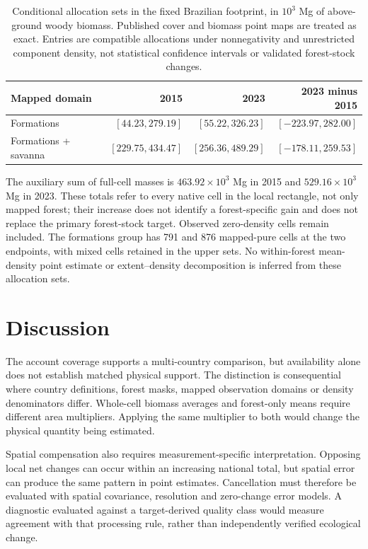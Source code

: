 \documentclass[11pt,a4paper]{article}
\begin{document}
\begin{table}[htbp]
\centering\small
\caption{Conditional allocation sets in the fixed Brazilian footprint, in $10^3$ Mg of above-ground woody biomass. Published cover and biomass point maps are treated as exact. Entries are compatible allocations under nonnegativity and unrestricted component density, not statistical confidence intervals or validated forest-stock changes.}\label{tab:allocation}
\begin{tabular}{lrrr}
\toprule
Mapped domain & 2015 & 2023 & 2023 minus 2015\\\midrule
Formations & $[44.23, 279.19]$ & $[55.22, 326.23]$ & $[-223.97, 282.00]$ \\
Formations + savanna & $[229.75, 434.47]$ & $[256.36, 489.29]$ & $[-178.11, 259.53]$ \\
\bottomrule
\end{tabular}
\end{table}

The auxiliary sum of full-cell masses is $463.92\times10^3$ Mg in 2015 and $529.16\times10^3$ Mg in 2023. These totals refer to every native cell in the local rectangle, not only mapped forest; their increase does not identify a forest-specific gain and does not replace the primary forest-stock target. Observed zero-density cells remain included. The formations group has 791 and 876 mapped-pure cells at the two endpoints, with mixed cells retained in the upper sets. No within-forest mean-density point estimate or extent--density decomposition is inferred from these allocation sets.

\section{Discussion}
The account coverage supports a multi-country comparison, but availability alone does not establish matched physical support. The distinction is consequential where country definitions, forest masks, mapped observation domains or density denominators differ. Whole-cell biomass averages and forest-only means require different area multipliers. Applying the same multiplier to both would change the physical quantity being estimated.

Spatial compensation also requires measurement-specific interpretation. Opposing local net changes can occur within an increasing national total, but spatial error can produce the same pattern in point estimates. Cancellation must therefore be evaluated with spatial covariance, resolution and zero-change error models. A diagnostic evaluated against a target-derived quality class would measure agreement with that processing rule, rather than independently verified ecological change.
\end{document}
